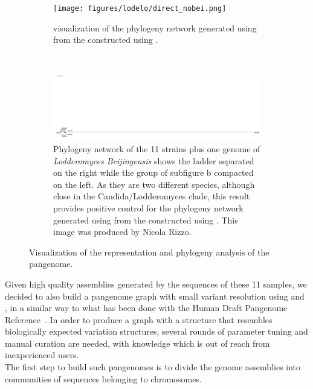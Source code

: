 \begin{figure}[h!]
	\centering
	\begin{subfigure}[b]{\textwidth}
		\centering
		\texttt{[image: figures/lodelo/direct\_nobei.png]}
		\caption{\splitstree visualization of the phylogeny network generated using \sans from the \ccdbg constructed using \bifrost.}
		\label{fig:dbg_phyl}
	\end{subfigure}%
	\\
	\begin{subfigure}[b]{\textwidth}
	\centering
	\includegraphics[width=1\linewidth]{figures/lodelo/lodelo_bei.png}
	\caption{Phylogeny network of the 11 \lodelo strains plus one genome of \emph{Lodderomyces Beijingensis} shows the ladder separated on the right while the group of subfigure b compacted on the left. As they are two different species, although close in the Candida/Lodderomyces clade\cite{lodelo_genomes}, this result provides positive control for the phylogeny network generated using \sans from the \ccdbg constructed using \bifrost. This image was produced by Nicola Rizzo.}
	\label{fig:beig_phyl}
	\end{subfigure}%
	\caption[\ccdbg representation and phylogeny analysis of the \lodelo pangenome.]{Visualization of the \ccdbg representation and phylogeny analysis of the \lodelo pangenome.}
\end{figure}
Given high quality assemblies generated by the sequences of these 11 samples, we decided to also build a pangenome graph with small variant resolution using \pggb and \mcactus, in a similar way to what has been done with the Human Draft Pangenome Reference~\cite{hdpr}. In order to produce a graph with a structure that resembles biologically expected variation structures, several rounds of parameter tuning and manual curation are needed, with knowledge which is out of reach from inexperienced users.\\
The first step to build such pangenomes is to divide the genome assemblies into communities of sequences belonging to chromosomes.

